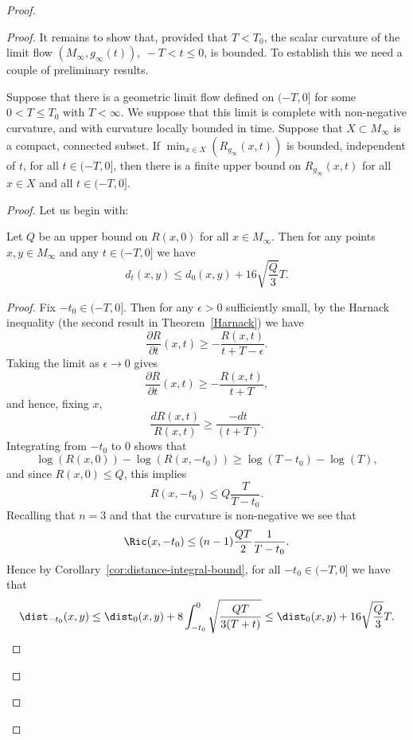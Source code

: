 \begin{proof}
\begin{proof}
It remains to show that, provided that $T<T_0$, the scalar curvature
of the limit flow $(M_\infty,g_\infty(t)),\ -T<t\le 0$, is bounded.
 To establish this we need a couple of preliminary results.

\begin{lemma}
\label{lem:curvature-bound-compact-subset}
\label{compactbd}
Suppose that there is a geometric limit flow defined on $(-T,0]$ for
some $0<T\le T_0$ with $T<\infty$. We suppose that this limit is
complete with non-negative curvature, and with curvature locally
bounded in time. Suppose that $X\subset M_\infty$ is a compact,
connected subset. If $\min_{x\in X}(R_{g_\infty} (x,t))$ is
bounded, independent of $t$, for all $t\in (-T,0]$, then there is a
finite upper bound on $R_{g_\infty}(x,t)$ for all $x\in X$ and all
$t\in(-T,0]$.
\end{lemma}


\begin{proof}
Let us begin with:

\begin{claim}
\label{claim:distance-distortion-bound}
\label{distch}
 Let $Q$ be an upper bound on $R(x,0)$ for all $x\in
M_\infty$. Then for any points $x,y\in M_\infty$ and any $t\in
(-T,0]$ we have
$$d_{t}(x,y)\le d_0(x,y)+16\sqrt{\frac{Q}{3}}T.$$
\end{claim}

\begin{proof}
Fix $-t_0\in (-T,0]$. Then for any $\epsilon>0$ sufficiently small,
by the Harnack inequality
(the second result in Theorem~\ref{Harnack})
 we have
$$\frac{\partial R}{\partial t}(x,t)\ge -\frac{R(x,t)}{t+T-\epsilon}.$$
Taking the limit as $\epsilon\rightarrow 0$ gives
$$\frac{\partial R}{\partial t}(x,t)\ge -\frac{R(x,t)}{t+T},$$
and hence, fixing $x$,
$$\frac{dR(x,t)}{R(x,t)}\ge \frac{-dt}{(t+T)}.$$
Integrating from $-t_0$ to $0$ shows that
$$\log(R(x,0))-\log(R(x,-t_0))\ge \log(T-t_0)-\log(T),$$
and since $R(x,0)\le Q$, this implies
$$R(x,-t_0)\le Q\frac{T}{T-t_0}.$$
Recalling that $n=3$ and that the curvature is non-negative we see that
$$\Ric(x,-t_0)\le (n-1)\frac{QT}{2}\frac{1}{T-t_0}.$$
Hence by Corollary~\ref{cor:distance-integral-bound}, for all $-t_0\in (-T,0]$ we have
that
$$\dist_{-t_0}(x,y)\le \dist_0(x,y)+8\int_{-t_0}^0\sqrt{\frac{QT}{3(T+t)}}
\le \dist_0(x,y)+16\sqrt{\frac{Q}{3}}T.$$
\end{proof}


\end{proof}
\end{proof}
\end{proof}
